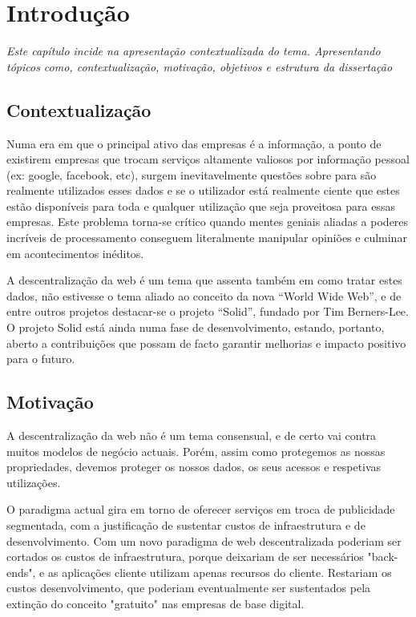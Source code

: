 \chapter{Introdução}
\label{cap:1}
\emph{Este capítulo incide na apresentação contextualizada do tema. Apresentando tópicos como, contextualização, motivação, objetivos e estrutura da dissertação}


\section{Contextualização}
Numa era em que o principal ativo das empresas é a informação, a ponto de existirem empresas que trocam serviços altamente valiosos por informação pessoal (ex: google, facebook, etc), surgem inevitavelmente questões sobre para são realmente utilizados esses dados e se o utilizador está realmente ciente que estes estão disponíveis para toda e qualquer utilização que seja proveitosa para essas empresas. Este problema torna-se crítico quando mentes geniais aliadas a poderes incríveis de processamento conseguem literalmente manipular opiniões e culminar em acontecimentos inéditos.

A descentralização da web é um tema que assenta também em como tratar estes dados, não estivesse o tema aliado ao conceito da nova “World Wide Web”, e de entre outros projetos destacar-se o projeto “Solid”, fundado por Tim Berners-Lee. O projeto Solid está ainda numa fase de desenvolvimento, estando, portanto, aberto a contribuições que possam de facto garantir melhorias e impacto positivo para o futuro.

\section{Motivação}
A descentralização da web não é um tema consensual, e de certo vai contra muitos modelos de negócio actuais. Porém, assim como protegemos as nossas propriedades, devemos proteger os nossos dados, os seus acessos e respetivas utilizações.

O paradigma actual gira em torno de oferecer serviços em troca de publicidade segmentada, com a justificação de sustentar custos de infraestrutura e de desenvolvimento. Com um novo paradigma de web descentralizada poderiam ser cortados os custos de infraestrutura, porque deixariam de ser necessários "back-ends", e as aplicações cliente utilizam apenas recursos do cliente. Restariam os custos desenvolvimento, que poderiam eventualmente ser sustentados pela extinção do conceito "gratuito" nas empresas de base digital.

